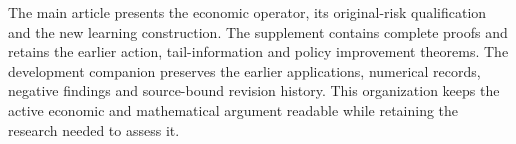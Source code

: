 The main article presents the economic operator, its original-risk
qualification and the new learning construction. The supplement contains
complete proofs and retains the earlier action, tail-information and policy
improvement theorems. The development companion preserves the earlier
applications, numerical records, negative findings and source-bound revision
history. This organization keeps the active economic and mathematical
argument readable while retaining the research needed to assess it.
